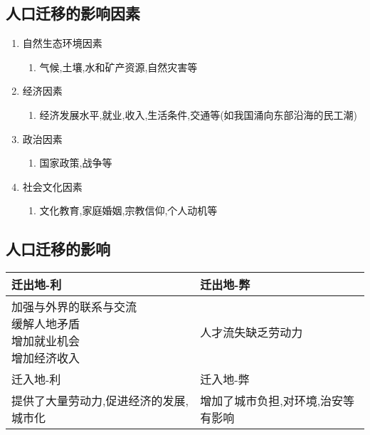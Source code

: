 \documentclass[a4paper]{article}
\begin{document}
    \subsection{人口迁移的影响因素}
    \begin{enumerate}
        \item 自然生态环境因素
        \begin{enumerate}
            \item 气候,土壤,水和矿产资源,自然灾害等
        \end{enumerate}
        \item 经济因素
        \begin{enumerate}
            \item 经济发展水平,就业,收入,生活条件,交通等(如我国涌向东部沿海的民工潮)
        \end{enumerate}
        \item 政治因素
        \begin{enumerate}
            \item 国家政策,战争等
        \end{enumerate}
        \item 社会文化因素
        \begin{enumerate}
            \item 文化教育,家庭婚姻,宗教信仰,个人动机等
        \end{enumerate}
    \end{enumerate}
    \subsection{人口迁移的影响}
        \begin{tabular}{|l|l|} %
            \hline
            迁出地-利 & 迁出地-弊 \\
            \hline
            \makecell[l]{加强与外界的联系与交流\\ 缓解人地矛盾\\增加就业机会\\增加经济收入} &  人才流失缺乏劳动力 \\
            \hline
            迁入地-利 & 迁入地-弊 \\
            \hline
            提供了大量劳动力,促进经济的发展,城市化 &   增加了城市负担,对环境,治安等有影响 \\
            \hline
        \end{tabular}
\end{document}
